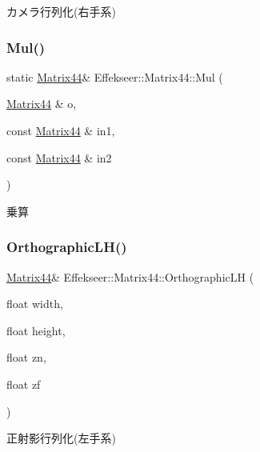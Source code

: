 カメラ行列化(右手系) 

\mbox{\label{struct_effekseer_1_1_matrix44_ab0200013341b97e62273a5085ee67448}} 
\subsubsection{\texorpdfstring{Mul()}{Mul()}}
{\footnotesize\ttfamily static \mbox{\hyperlink{struct_effekseer_1_1_matrix44}{Matrix44}}\& Effekseer\+::\+Matrix44\+::\+Mul (\begin{DoxyParamCaption}\item[{\mbox{\hyperlink{struct_effekseer_1_1_matrix44}{Matrix44}} \&}]{o,  }\item[{const \mbox{\hyperlink{struct_effekseer_1_1_matrix44}{Matrix44}} \&}]{in1,  }\item[{const \mbox{\hyperlink{struct_effekseer_1_1_matrix44}{Matrix44}} \&}]{in2 }\end{DoxyParamCaption})\hspace{0.3cm}{\ttfamily [static]}}



乗算 

\mbox{\label{struct_effekseer_1_1_matrix44_a8b53aee4d2c1598cbdd64ab6a6364af2}} 
\subsubsection{\texorpdfstring{Orthographic\+L\+H()}{OrthographicLH()}}
{\footnotesize\ttfamily \mbox{\hyperlink{struct_effekseer_1_1_matrix44}{Matrix44}}\& Effekseer\+::\+Matrix44\+::\+Orthographic\+LH (\begin{DoxyParamCaption}\item[{float}]{width,  }\item[{float}]{height,  }\item[{float}]{zn,  }\item[{float}]{zf }\end{DoxyParamCaption})}



正射影行列化(左手系) 

